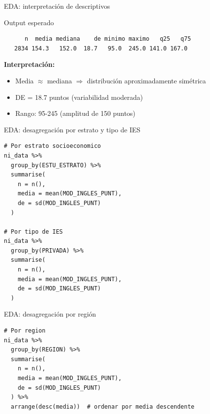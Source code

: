 \documentclass[aspectratio=169, 11pt]{beamer}
\begin{document}
\begin{frame}[fragile]{EDA: interpretación de descriptivos}
\begin{exampleblock}{Output esperado}
\small
\begin{verbatim}
      n  media mediana    de minimo maximo   q25   q75
   2834 154.3   152.0  18.7   95.0  245.0 141.0 167.0
\end{verbatim}
\end{exampleblock}

\vspace{0.3cm}
\textbf{Interpretación:}
\begin{itemize}
\item Media $\approx$ mediana $\Rightarrow$ distribución aproximadamente simétrica
\item DE = 18.7 puntos (variabilidad moderada)
\item Rango: 95-245 (amplitud de 150 puntos)
\end{itemize}
\end{frame}

\begin{frame}[fragile]{EDA: desagregación por estrato y tipo de IES}
\begin{lstlisting}
# Por estrato socioeconomico
ni_data %>%
  group_by(ESTU_ESTRATO) %>%
  summarise(
    n = n(),
    media = mean(MOD_INGLES_PUNT),
    de = sd(MOD_INGLES_PUNT)
  )

# Por tipo de IES
ni_data %>%
  group_by(PRIVADA) %>%
  summarise(
    n = n(),
    media = mean(MOD_INGLES_PUNT),
    de = sd(MOD_INGLES_PUNT)
  )
\end{lstlisting}
\end{frame}

\begin{frame}[fragile]{EDA: desagregación por región}
\begin{lstlisting}
# Por region
ni_data %>%
  group_by(REGION) %>%
  summarise(
    n = n(),
    media = mean(MOD_INGLES_PUNT),
    de = sd(MOD_INGLES_PUNT)
  ) %>%
  arrange(desc(media))  # ordenar por media descendente
\end{lstlisting}
\end{frame}
\end{document}
